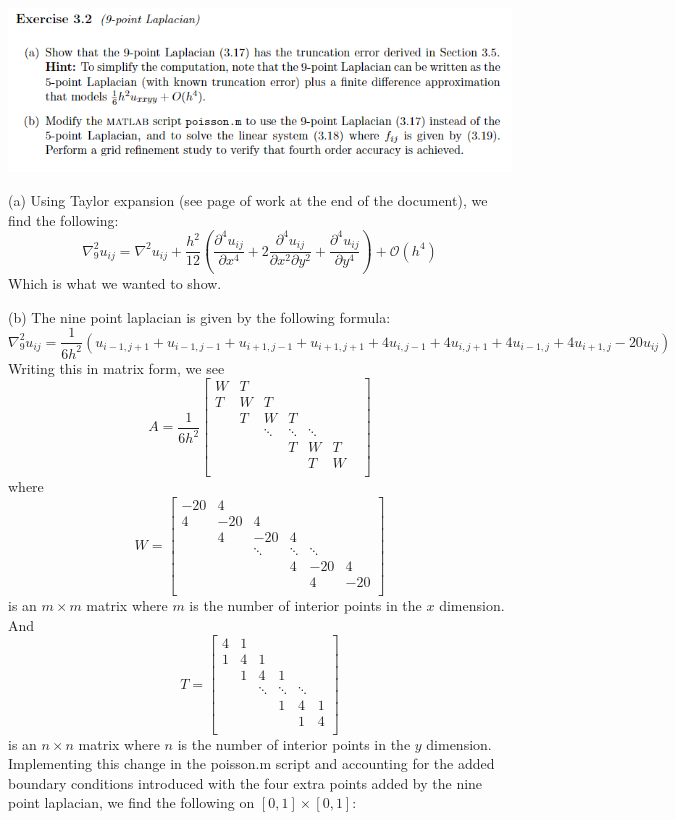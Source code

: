 \documentclass{article}
\begin{document}
\includegraphics[scale = 0.8]{ex3.2.PNG}

(a) Using Taylor expansion (see page of work at the end of the document), we find the following:
\[\nabla^2_9 u_{ij} = \nabla^2 u_{ij} + \frac{h^2}{12}\left( \frac{\partial^4u_{ij}}{\partial x^4} + 2\frac{\partial^4u_{ij}}{\partial x^2 \partial y^2}  + \frac{\partial^4u_{ij}}{\partial y^4}\right) + \mathcal{O}(h^4) \]
Which is what we wanted to show.
\newline

(b) The nine point laplacian is given by the following formula:
\[\nabla^2_9 u_{ij} = \frac{1}{6h^2}(u_{i-1,j+1} + u_{i-1,j-1} + u_{i+1,j-1} + u_{i+1,j+1} + 4u_{i,j-1} + 4u_{i,j+1} + 4u_{i-1,j} + 4u_{i+1,j} - 20u_{ij})\]
Writing this in matrix form, we see
\[A = \frac{1}{6h^2}\begin{bmatrix}
    W & T & & & & & \\
    T & W & T & & & \\
     & T & W & T & & \\
     & & \ddots & \ddots & \ddots & \\
     & & & T & W & T\\
     & & & & T & W\\
\end{bmatrix}\]
where 
\[W = \begin{bmatrix}
    -20 & 4 & & & \\
    4 & -20 & 4 & & \\
     & 4 & -20 & 4 & \\
     & & \ddots & \ddots & \ddots\\
     & & & 4 & -20 & 4 \\
     & & & & 4 & -20 \\
\end{bmatrix}\]
is an $m \times m$ matrix where $m$ is the number of interior points in the $x$ dimension. And
\[T = \begin{bmatrix}
    4 & 1 & & & & \\
    1 & 4 & 1 & & & \\
     & 1 & 4 & 1 & & \\
     & & \ddots & \ddots & \ddots & \\
     & & & 1 & 4 & 1\\
     & & & & 1 & 4 \\ 
\end{bmatrix}\]
is an $n \times n$ matrix where $n$ is the number of interior points in the $y$ dimension. Implementing this change in the poisson.m script and accounting for the added boundary conditions introduced with the four extra points added by the nine point laplacian, we find the following on $[0,1] \times [0,1]$:
\end{document}

